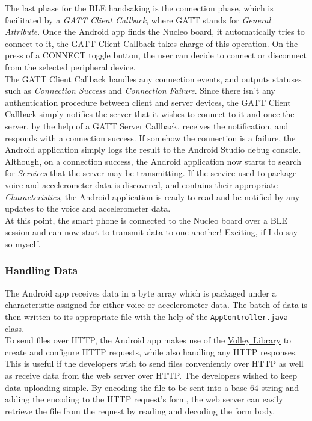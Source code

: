 The last phase for the BLE handsaking is the connection phase, which is facilitated by a \textit{GATT Client Callback}, where GATT stands for \textit{General Attribute}. Once the Android app finds the Nucleo board, it automatically tries to connect to it, the GATT Client Callback takes charge of this operation. On the press of a CONNECT toggle button, the user can decide to connect or disconnect from the selected peripheral device.\\

The GATT Client Callback handles any connection events, and outputs statuses such as \textit{Connection Success} and \textit{Connection Failure}. Since there isn't any authentication procedure between client and server devices, the GATT Client Callback simply notifies the server that it wishes to connect to it and once the server, by the help of a GATT Server Callback, receives the notification, and responds with a connection success. If somehow the connection is a failure, the Android application simply logs the result to the Android Studio debug console. Although, on a connection success, the Android application now starts to search for \textit{Services} that the server may be transmitting. If the service used to package voice and accelerometer data is discovered, and contains their appropriate \textit{Characteristics}, the Android application is ready to read and be notified by any updates to the voice and accelerometer data.\\

At this point, the smart phone is connected to the Nucleo board over a BLE session and can now start to transmit data to one another! Exciting, if I do say so myself.

\subsubsection{Handling Data}

The Android app receives data in a byte array which is packaged under a characteristic assigned for either voice or accelerometer data. The batch of data is then written to its appropriate file with the help of the \texttt{AppController.java} class.\\

To send files over HTTP, the Android app makes use of the \href{https://developer.android.com/training/volley/index.html}{Volley Library} to create and configure HTTP requests, while also handling any HTTP responses. This is useful if the developers wish to send files conveniently over HTTP as well as receive data from the web server over HTTP. The developers wished to keep data uploading simple. By encoding the file-to-be-sent into a base-64 string and adding the encoding to the HTTP request's form, the web server can easily retrieve the file from the request by reading and decoding the form body.

